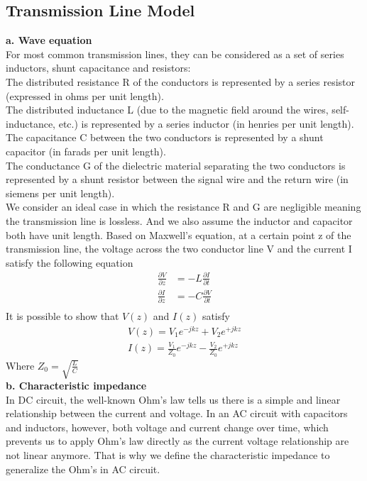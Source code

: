 \documentclass[a4paper]{article}
\begin{document}
\subsection{Transmission Line Model}
{\bf a. Wave equation}\\
For most common transmission lines, they can be considered as a set of series inductors, shunt capacitance and resistors:\\
The distributed resistance R of the conductors is represented by a series resistor (expressed in ohms per unit length).\\
The distributed inductance L (due to the magnetic field around the wires, self-inductance, etc.) is represented by a series inductor (in henries per unit length).\\
The capacitance C between the two conductors is represented by a shunt capacitor (in farads per unit length).\\
The conductance G of the dielectric material separating the two conductors is represented by a shunt resistor between the signal wire and the return wire (in siemens per unit length).\\
We consider an ideal case in which the resistance R and G are negligible meaning the transmission line is lossless. And we also assume the inductor and capacitor both have unit length. Based on Maxwell's equation, at a certain point z of the transmission line, the voltage across the two conductor line V and the current I satisfy the following equation
\begin{align*}
	\frac{\partial V}{\partial z} & = -L \frac{\partial I}{\partial t} \\
	\frac{\partial I}{\partial z} & = -C \frac{\partial V}{\partial t} \\
\end{align*}
It is possible to show that $V(z)$ and $I(z)$ satisfy
\begin{align*}
	V(z) = V_1 e^{-jkz} + V_2 e^{+jkz} \\
	I(z) = \frac{V_1}{Z_0} e^{-jkz} - \frac{V_2}{Z_0} e^{+jkz}
\end{align*}
Where $Z_0 = \sqrt{\frac{L}{C}}$\\
{\bf b. Characteristic impedance}\\
In DC circuit, the well-known Ohm's law tells us there is a simple and linear relationship between the current and voltage. 
In an AC circuit with capacitors and inductors, however, both voltage and current change over time, which prevents us to apply Ohm's law directly as the current voltage relationship are not linear anymore. That is why we define the characteristic impedance to generalize the Ohm's in AC circuit.\\
\end{document}
